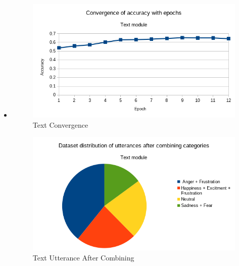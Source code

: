 \documentclass[oneside,a4paper,12pt]{report}
\begin{document}
\begin{normalsize}
\begin{itemize}
	\begin{itemize}
		\item
		
		\begin{center}
			\begin{figure}[!htbp]
				\centering
				\includegraphics[width=\textwidth]{text-convergence.png}
				\caption{Text Convergence}
				\label{fig:text-convergence}
			\end{figure}
		\end{center} 
		
		\begin{center}
			\begin{figure}[!htbp]
				\centering
				\includegraphics[width=\textwidth]{text-utterance-after-combining.png}
				\caption{Text Utterance After Combining}
				\label{fig:text-uttr-after-comb}
			\end{figure}
		\end{center} 
		

\end{itemize}
\end{itemize}
\end{normalsize}
\end{document}
